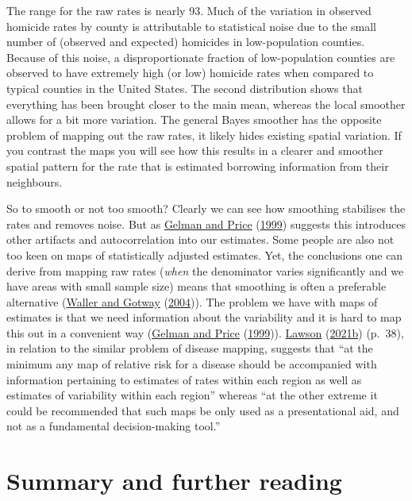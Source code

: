 \documentclass[
]{book}
\begin{document}
The range for the raw rates is nearly 93. Much of the variation in observed homicide rates by county is attributable to statistical noise due to the small number of (observed and expected) homicides in low-population counties. Because of this noise, a disproportionate fraction of low-population counties are observed to have extremely high (or low) homicide rates when compared to typical counties in the United States. The second distribution shows that everything has been brought closer to the main mean, whereas the local smoother allows for a bit more variation. The general Bayes smoother has the opposite problem of mapping out the raw rates, it likely hides existing spatial variation. If you contrast the maps you will see how this results in a clearer and smoother spatial pattern for the rate that is estimated borrowing information from their neighbours.

So to smooth or not too smooth? Clearly we can see how smoothing stabilises the rates and removes noise. But as \protect\hyperlink{ref-Gelman_1999}{Gelman and Price} (\protect\hyperlink{ref-Gelman_1999}{1999}) suggests this introduces other artifacts and autocorrelation into our estimates. Some people are also not too keen on maps of statistically adjusted estimates. Yet, the conclusions one can derive from mapping raw rates (\emph{when} the denominator varies significantly and we have areas with small sample size) means that smoothing is often a preferable alternative (\protect\hyperlink{ref-Waller_2004}{Waller and Gotway} (\protect\hyperlink{ref-Waller_2004}{2004})). The problem we have with maps of estimates is that we need information about the variability and it is hard to map this out in a convenient way (\protect\hyperlink{ref-Gelman_1999}{Gelman and Price} (\protect\hyperlink{ref-Gelman_1999}{1999})). \protect\hyperlink{ref-Lawson_2006}{Lawson} (\protect\hyperlink{ref-Lawson_2006}{2021b}) (p.~38), in relation to the similar problem of disease mapping, suggests that ``at the minimum any map of relative risk for a disease should be accompanied with information pertaining to estimates of rates within each region as well as estimates of variability within each region'' whereas ``at the other extreme it could be recommended that such maps be only used as a presentational aid, and not as a fundamental decision-making tool.''

\hypertarget{summary-and-further-reading-2}{%
\section{Summary and further reading}\label{summary-and-further-reading-2}}
\end{document}
